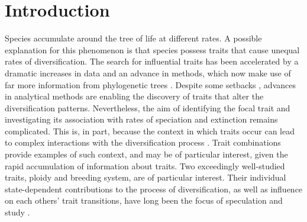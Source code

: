 \section{Introduction}


Species accumulate around the tree of life at different rates.
A possible explanation for this phenomenon is that species possess traits that cause unequal rates of diversification. %
The search for influential traits has been accelerated by a dramatic increases in data and an advance in methods, which now make use of far more information from phylogenetic trees \citep{maddison_2007}. 
Despite some setbacks \citep{maddison_2015, rabosky_2015, moore_2016}, advances in analytical methods \citep{fitzjohn_2009, goldberg_2012, beaulieu_2016, rabosky_2017} are enabling the discovery of traits that alter the diversification patterns. %
Nevertheless, the aim of identifying the focal trait and investigating its association with rates of speciation and extinction remains complicated. 
This is, in part, because the context in which traits occur can lead to complex interactions with the diversification process \citep[see][]{caetano_2018, herrera_2018}.
Trait combinations provide examples of such context, and may be of particular interest, given the rapid accumulation of information about traits. %
Two exceedingly well-studied traits, ploidy and breeding system, are of particular interest. 
Their individual state-dependent contributions to the process of diversification, as well as influence on each others' trait transitions, have long been the focus of speculation and study \citep{stebbins1950}.

